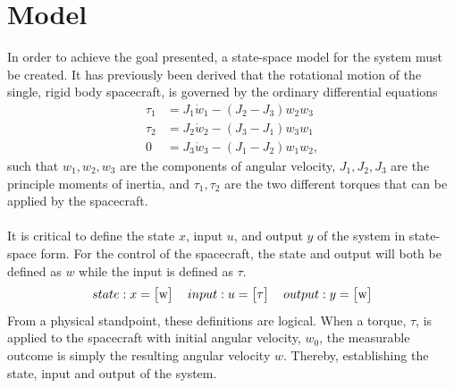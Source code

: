 \documentclass[12pt]{article}
\begin{document}
\section{Model}
In order to achieve the goal presented, a state-space model for the system must be created. It has previously been derived that the rotational motion of the single, rigid body spacecraft, is governed by the ordinary differential equations
\begin{equation}
\label{eq:1} 
\begin{aligned}
\tau_{1} &= J_{1}\dot{w}_{1}-(J_{2}-J_{3})w_{2}w_{3} \\
\tau_{2} &= J_{2}\dot{w}_{2}-(J_{3}-J_{1})w_{3}w_{1} \\
0 &= J_{3}\dot{w}_{3}-(J_{1}-J_{2})w_{1}w_{2},
\end{aligned}
\end{equation}
such that $w_{1},w_{2},w_{3}$ are the components of angular velocity, $J_{1},J_{2},J_{3}$ are the principle moments of inertia, and $\tau_{1},\tau_{2}$ are the two different torques that can be applied by the spacecraft.
\\
\\
It is critical to define the state $x$, input $u$, and output $y$ of the system in state-space form. For the control of the spacecraft, the state and output will both be defined as $w$ while the input is defined as $\tau$. 
\begin{align*}
state: x = \begin{bmatrix} $w$ \end{bmatrix} \quad
input: u = \begin{bmatrix} \tau \end{bmatrix} \quad
output: y = \begin{bmatrix} $w$ \end{bmatrix}
\end{align*}
From a physical standpoint, these definitions are logical. When a torque, $\tau$, is applied to the spacecraft with initial angular velocity, $w_{0}$, the measurable outcome is simply the resulting angular velocity $w$. Thereby, establishing the state, input and output of the system. 
\end{document}
